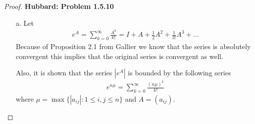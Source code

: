 \documentclass[11pt]{article}
\theoremstyle{definition}
\begin{document}
\begin{proof}{\textbf{Hubbard: Problem 1.5.10}}
\begin{itemize}
    \item[a.] Let 
    \begin{align*}
        e^A = \sum_{k=0}^\infty \frac{A^k}{k!} = I + A + \frac{1}{2}A^2 +
        \frac{1}{3!}A^3 + ...
    \end{align*}
    Because of Proposition 2.1 from Gallier we know that the series is
    absolutely convergent this implies that the original series is convergent
    as well.

    Also, it is shown that the series $|e^A|$ is bounded by the following
    series 
    \begin{align*}
        e^{n\mu} = \sum_{k=0}^\infty \frac{(n\mu)^k}{k!}
    \end{align*}
    where $\mu = \max\{|a_{ij}|: 1 \leq i,j \leq n\}$ and $A = (a_{ij})$.


\end{itemize}
\end{proof}
\end{document}

